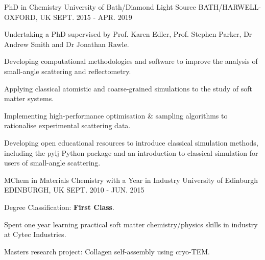 \begin{cventries}
  \cventry
    {PhD in Chemistry}
    {University of Bath/Diamond Light Source}
    {BATH/HARWELL-OXFORD, UK}
    {SEPT. 2015 - APR. 2019}
    {
      \begin{cvitems}
        \item {Undertaking a PhD supervised by Prof. Karen Edler, Prof. Stephen Parker, Dr Andrew Smith and Dr Jonathan Rawle.}
        \item {Developing computational methodologies and software to improve the analysis of small-angle scattering and reflectometry.}
        \item {Applying classical atomistic and coarse-grained simulations to the study of soft matter systems.}
        \item {Implementing high-performance optimisation \& sampling algorithms to rationalise experimental scattering data.}
        \item {Developing open educational resources to introduce classical simulation methods, including the pylj Python package and an introduction to classical simulation for users of small-angle scattering.}
      \end{cvitems}
    }
  \cventry
    {MChem in Materials Chemistry with a Year in Industry}
    {University of Edinburgh}
    {EDINBURGH, UK}
    {SEPT. 2010 - JUN. 2015}
    {
      \begin{cvitems}
        \item {Degree Classification: \textbf{First Class}.}
        \item {Spent one year learning practical soft matter chemistry/physics skills in industry at Cytec Industries.}
        \item {Masters research project: Collagen self-assembly using cryo-TEM.}
      \end{cvitems}
    }
\end{cventries}
